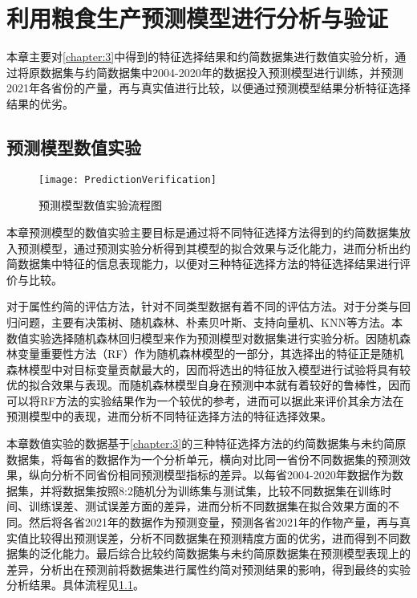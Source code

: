 \chapter{利用粮食生产预测模型进行分析与验证}
\label{chapter:4}
本章主要对\ref{chapter:3}中得到的特征选择结果和约简数据集进行数值实验分析，通过将原数据集与约简数据集中2004-2020年的数据投入预测模型进行训练，并预测2021年各省份的产量，再与真实值进行比较，以便通过预测模型结果分析特征选择结果的优劣。
\section{预测模型数值实验}
\begin{figure}[!htb]
  \centering
  \resizebox{\textwidth}{!}
  {
  \texttt{[image: PredictionVerification]}
  }
  \caption{预测模型数值实验流程图}
  \label{fig:PredictionVerification}
\end{figure}

本章预测模型的数值实验主要目标是通过将不同特征选择方法得到的约简数据集放入预测模型，通过预测实验分析得到其模型的拟合效果与泛化能力，进而分析出约简数据集中特征的信息表现能力，以便对三种特征选择方法的特征选择结果进行评价与比较。

对于属性约简的评估方法，针对不同类型数据有着不同的评估方法。对于分类与回归问题，主要有决策树、随机森林、朴素贝叶斯、支持向量机、KNN等方法\cite{BestOverview}。本数值实验选择随机森林回归模型来作为预测模型对数据集进行实验分析。因随机森林变量重要性方法（RF）作为随机森林模型的一部分，其选择出的特征正是随机森林模型中对目标变量贡献最大的，因而将选出的特征放入模型进行试验将具有较优的拟合效果与表现。而随机森林模型自身在预测中本就有着较好的鲁棒性，因而可以将RF方法的实验结果作为一个较优的参考，进而可以据此来评价其余方法在预测模型中的表现，进而分析不同特征选择方法的特征选择效果。

本章数值实验的数据基于\ref{chapter:3}的三种特征选择方法的约简数据集与未约简原数据集，将每省的数据作为一个分析单元，横向对比同一省份不同数据集的预测效果，纵向分析不同省份相同预测模型指标的差异。以每省2004-2020年数据作为数据集，并将数据集按照8:2随机分为训练集与测试集，比较不同数据集在训练时间、训练误差、测试误差方面的差异，进而分析不同数据集在拟合效果方面的不同。然后将各省2021年的数据作为预测变量，预测各省2021年的作物产量，再与真实值比较得出预测误差，分析不同数据集在预测精度方面的优劣，进而得到不同数据集的泛化能力。最后综合比较约简数据集与未约简原数据集在预测模型表现上的差异，分析出在预测前将数据集进行属性约简对预测结果的影响，得到最终的实验分析结果。具体流程见\ref{fig:PredictionVerification}。

